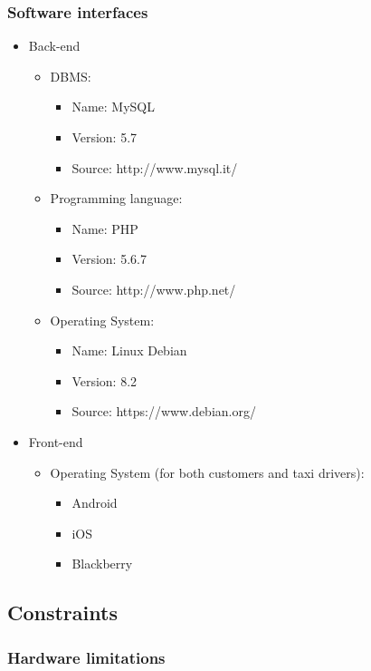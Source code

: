 \subsubsection{Software interfaces}
\begin{itemize}
\item Back-end
\begin{itemize}
	\item DBMS:
	\begin{itemize}
		\item Name: MySQL
		\item Version: 5.7
		\item Source: http://www.mysql.it/
	\end{itemize}
	
	\item Programming language:
	\begin{itemize}
		\item Name: PHP
		\item Version: 5.6.7
		\item Source: http://www.php.net/
	\end{itemize}
	
	\item Operating System:
	\begin{itemize}
		\item Name: Linux Debian
		\item Version: 8.2
		\item Source: https://www.debian.org/
	\end{itemize}	
\end{itemize}

\item Front-end
\begin{itemize}
\item Operating System (for both customers and taxi drivers):
	\begin{itemize}
		\item Android
		\item iOS
		\item Blackberry
	\end{itemize}
\end{itemize}
\end{itemize}

\pagebreak
\subsection{Constraints}

\subsubsection{Hardware limitations}

